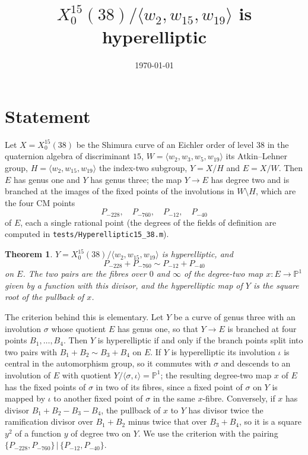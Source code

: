 \documentclass[11pt,reqno]{amsart}
\theoremstyle{plain}
\newtheorem{theorem}{Theorem}[section]
\theoremstyle{definition}
\begin{document}
\title{$X_0^{15}(38)/\langle w_2,w_{15},w_{19}\rangle$ is hyperelliptic}
\author{}
\date{\today}
\maketitle

\section{Statement}

Let $X=X_0^{15}(38)$ be the Shimura curve of an Eichler order of level $38$ in the quaternion algebra of
discriminant $15$, $W=\langle w_2,w_3,w_5,w_{19}\rangle$ its Atkin--Lehner group, $H=\langle w_2,w_{15},w_{19}\rangle$
the index-two subgroup, $Y=X/H$ and $E=X/W$. Then $E$ has genus one and $Y$ has genus three; the map
$Y\to E$ has degree two and is branched at the images of the fixed points of the involutions in $W\setminus H$,
which are the four CM points
\[
P_{-228},\quad P_{-760},\quad P_{-12},\quad P_{-40}
\]
of $E$, each a single rational point (the degrees of the fields of definition are computed in
\texttt{tests/Hyperelliptic15\_38.m}).

\begin{theorem}\label{thm:main}
$Y=X_0^{15}(38)/\langle w_2,w_{15},w_{19}\rangle$ is hyperelliptic, and
\[
P_{-228}+P_{-760}\sim P_{-12}+P_{-40}
\]
on $E$. The two pairs are the fibres over $0$ and $\infty$ of the degree-two map $x\colon E\to\mathbb{P}^1$
given by a function with this divisor, and the hyperelliptic map of $Y$ is the square root of the pullback
of $x$.
\end{theorem}

The criterion behind this is elementary. Let $Y$ be a curve of genus three with an involution $\sigma$
whose quotient $E$ has genus one, so that $Y\to E$ is branched at four points $B_1,\dots,B_4$. Then $Y$ is
hyperelliptic if and only if the branch points split into two pairs with $B_1+B_2\sim B_3+B_4$ on $E$. If
$Y$ is hyperelliptic its involution $\iota$ is central in the automorphism group, so it commutes with
$\sigma$ and descends to an involution of $E$ with quotient $Y/\langle\sigma,\iota\rangle=\mathbb{P}^1$;
the resulting degree-two map $x$ of $E$ has the fixed points of $\sigma$ in two of its fibres, since a fixed
point of $\sigma$ on $Y$ is mapped by $\iota$ to another fixed point of $\sigma$ in the same $x$-fibre.
Conversely, if $x$ has divisor $B_1+B_2-B_3-B_4$, the pullback of $x$ to $Y$ has divisor twice the
ramification divisor over $B_1+B_2$ minus twice that over $B_3+B_4$, so it is a square $y^2$ of a function
$y$ of degree two on $Y$. We use the criterion with the pairing $\{P_{-228},P_{-760}\}\,|\,\{P_{-12},P_{-40}\}$.
\end{document}
